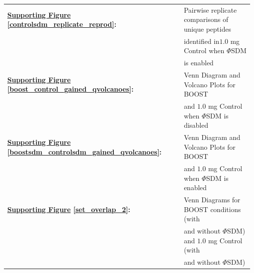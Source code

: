 \documentclass[journal=jprobs,manuscript=article]{achemso}
\begin{document}
\begin{table}[h!]
\begin{tabular}{ll}
        \textbf{\hyperref[controlsdm_replicate_reprod]{Supporting Figure} \ref{controlsdm_replicate_reprod}:} & Pairwise replicate comparisons of unique peptides  \\
                                                                                                                                                                    &  identified in$1.0$ mg Control when $\Phi$SDM\\
                                                                                                                                                                    &  is enabled \\

        \textbf{\hyperref[boost_control_gained_qvolcanoes]{Supporting Figure} \ref{boost_control_gained_qvolcanoes}:} & Venn Diagram and Volcano Plots for BOOST  \\
                                                                                                                                                                                                       &  and $1.0$ mg Control when $\Phi$SDM is disabled \\

        \textbf{\hyperref[boostsdm_controlsdm_gained_qvolcanoes]{Supporting Figure} \ref{boostsdm_controlsdm_gained_qvolcanoes}:} & Venn Diagram and Volcano Plots for BOOST  \\
                                                                                                                                                                                                       &  and $1.0$ mg Control when $\Phi$SDM is enabled \\

        \textbf{\hyperref[set_overlap_2]{Supporting Figure} \ref{set_overlap_2}:} & Venn Diagrams for BOOST conditions (with   \\
                                                                                                                                       & and without $\Phi$SDM) and $1.0$ mg Control (with \\
                                                                                                                                       & and without $\Phi$SDM)\\


\end{tabular}
\end{table}
\end{document}
